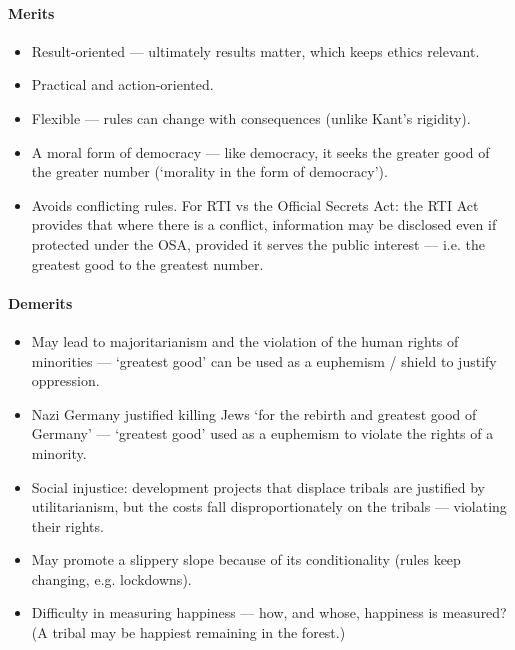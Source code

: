\paragraph{Merits}
\begin{itemize}
\item Result-oriented --- ultimately results matter, which keeps ethics relevant.
\item Practical and action-oriented.
\item Flexible --- rules can change with consequences (unlike Kant's rigidity).
\item A moral form of democracy --- like democracy, it seeks the greater good of the greater number (`morality in the form of democracy').
\item Avoids conflicting rules. For RTI vs the Official Secrets Act: the RTI Act provides that where there is a conflict, information may be disclosed even if protected under the OSA, provided it serves the public interest --- i.e. the greatest good to the greatest number.
\end{itemize}

\paragraph{Demerits}
\begin{itemize}
\item May lead to majoritarianism and the violation of the human rights of minorities --- `greatest good' can be used as a euphemism / shield to justify oppression.
\end{itemize}

\begin{ExampleBox}
\begin{itemize}
\item Nazi Germany justified killing Jews `for the rebirth and greatest good of Germany' --- `greatest good' used as a euphemism to violate the rights of a minority.
\item Social injustice: development projects that displace tribals are justified by utilitarianism, but the costs fall disproportionately on the tribals --- violating their rights.
\end{itemize}
\end{ExampleBox}

\begin{itemize}
\item May promote a slippery slope because of its conditionality (rules keep changing, e.g. lockdowns).
\item Difficulty in measuring happiness --- how, and whose, happiness is measured? (A tribal may be happiest remaining in the forest.)
\end{itemize}

